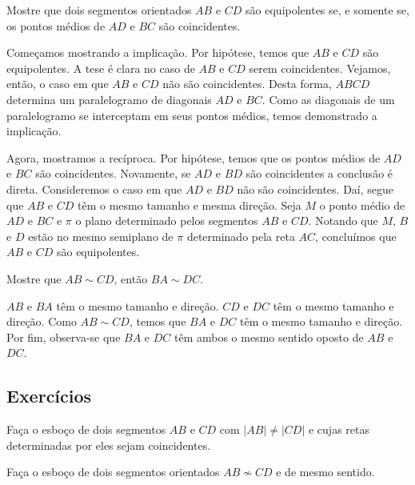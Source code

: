 \begin{exeresol}
  Mostre que dois segmentos orientados $AB$ e $CD$ são equipolentes se, e somente se, os pontos médios de $AD$ e $BC$ são coincidentes.
\end{exeresol}
\begin{resol}
  Começamos mostrando a implicação. Por hipótese, temos que $AB$ e $CD$ são equipolentes. A tese é clara no caso de $AB$ e $CD$ serem coincidentes. Vejamos, então, o caso em que $AB$ e $CD$ não são coincidentes. Desta forma, $ABCD$ determina um paralelogramo de diagonais $AD$ e $BC$. Como as diagonais de um paralelogramo se interceptam em seus pontos médios, temos demonstrado a implicação.

  Agora, mostramos a recíproca. Por hipótese, temos que os pontos médios de $AD$ e $BC$ são coincidentes. Novamente, se $AD$ e $BD$ são coincidentes a conclusão é direta. Consideremos o caso em que $AD$ e $BD$ não são coincidentes. Daí, segue que $AB$ e $CD$ têm o mesmo tamanho e mesma direção. Seja $M$ o ponto médio de $AD$ e $BC$ e $\pi$ o plano determinado pelos segmentos $AB$ e $CD$. Notando que $M$, $B$ e $D$ estão no mesmo semiplano de $\pi$ determinado pela reta $AC$, concluímos que $AB$ e $CD$ são equipolentes.
\end{resol}

\begin{exeresol}
  Mostre que $AB\sim CD$, então $BA\sim DC$.
\end{exeresol}
\begin{resol}
  $AB$ e $BA$ têm o mesmo tamanho e direção. $CD$ e $DC$ têm o mesmo tamanho e direção. Como $AB\sim CD$, temos que $BA$ e $DC$ têm o mesmo tamanho e direção. Por fim, observa-se que $BA$ e $DC$ têm ambos o mesmo sentido oposto de $AB$ e $DC$. 
\end{resol}

\subsection*{Exercícios}

\begin{exer}
  Faça o esboço de dois segmentos $AB$ e $CD$ com $|AB|\neq |CD|$ e cujas retas determinadas por eles sejam coincidentes.
\end{exer}

\begin{exer}
  Faça o esboço de dois segmentos orientados $AB\not\sim CD$ e de mesmo sentido.
\end{exer}

